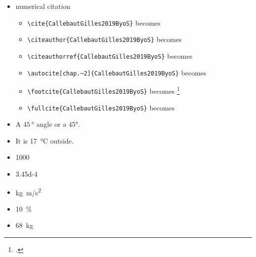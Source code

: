 \begin{itemize}
\begin{itemize}
    \item \verb!\cref{fig:example}! becomes \cref{fig:example}
    \item \verb!\cref{tab:example}! becomes \cref{tab:example}
    \item \verb!\cref{ch:introduction}! becomes \cref{ch:introduction}
    \item \cref{eq:emc2}


\end{itemize}
\item numerical citation~\cite{s19030585}
\begin{itemize}
    \item \verb!\cite{CallebautGilles2019ByoS}! becomes \cite{CallebautGilles2019ByoS}

    \item \verb!\citeauthor{CallebautGilles2019ByoS}! becomes \citeauthor{CallebautGilles2019ByoS}
    \item \verb!\citeauthorref{CallebautGilles2019ByoS}! becomes 
    \item \verb!\autocite[chap.~2]{CallebautGilles2019ByoS}! becomes \autocite[chap.~2]{CallebautGilles2019ByoS}
    \item \verb!\footcite{CallebautGilles2019ByoS}! becomes \footcite{CallebautGilles2019ByoS}
    \item \verb!\fullcite{CallebautGilles2019ByoS}! becomes 
\end{itemize}

    \item A $\SI{45}{\degree}$ angle or a \ang{45}.

    \item It is \SI{17}{\degreeCelsius} outside.

    \item  \num{1000}
    \item \num{3.45d-4}


    \item \si{kg.m/s^2} %

    \item \SI{10}{\percent}
    \item \SI{68}{kg}
\end{itemize}


